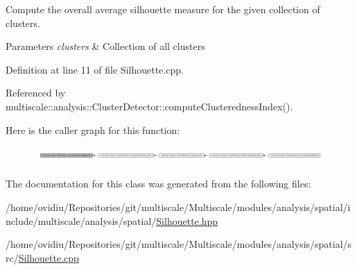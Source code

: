 \-Compute the overall average silhouette measure for the given collection of clusters. 


\begin{DoxyParams}{\-Parameters}
{\em clusters} & \-Collection of all clusters \\
\hline
\end{DoxyParams}


\-Definition at line 11 of file \-Silhouette.\-cpp.



\-Referenced by multiscale\-::analysis\-::\-Cluster\-Detector\-::compute\-Clusteredness\-Index().



\-Here is the caller graph for this function\-:
\nopagebreak
\begin{figure}[H]
\begin{center}
\leavevmode
\includegraphics[width=350pt]{classmultiscale_1_1analysis_1_1Silhouette_a21fab3292947caed2dbab0da542ac24c_icgraph}
\end{center}
\end{figure}




\-The documentation for this class was generated from the following files\-:\begin{DoxyCompactItemize}
\item 
/home/ovidiu/\-Repositories/git/multiscale/\-Multiscale/modules/analysis/spatial/include/multiscale/analysis/spatial/\hyperlink{Silhouette_8hpp}{\-Silhouette.\-hpp}\item 
/home/ovidiu/\-Repositories/git/multiscale/\-Multiscale/modules/analysis/spatial/src/\hyperlink{Silhouette_8cpp}{\-Silhouette.\-cpp}\end{DoxyCompactItemize}
